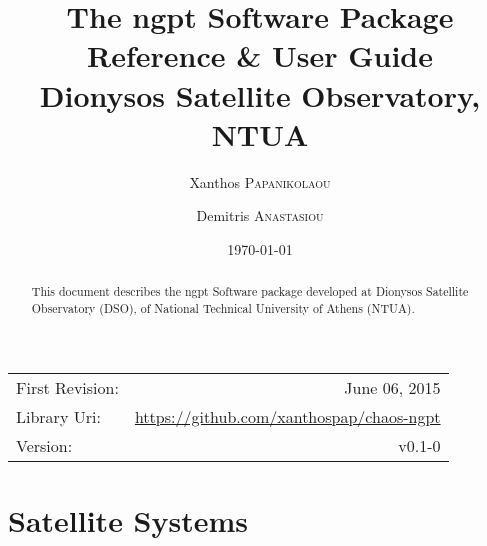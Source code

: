 \documentclass{article}
\title{The ngpt Software Package \\ Reference \& User Guide \\ Dionysos Satellite Observatory, NTUA} %
\author{Xanthos \textsc{Papanikolaou} \and Demitris \textsc{Anastasiou}} %
\date{\today} %
\begin{document}
\maketitle %

\begin{center}
\begin{tabular}{l r}
First Revision: & June 06, 2015 \\
Library Uri:    & \url{https://github.com/xanthospap/chaos-ngpt} \\
Version:        & v0.1-0
\end{tabular}
\end{center}

\begin{abstract}
{\small 
This document describes the ngpt Software package developed at Dionysos Satellite Observatory (DSO), of National Technical University
of Athens (NTUA).
}
\end{abstract}

\section{Satellite Systems}
\end{document}
